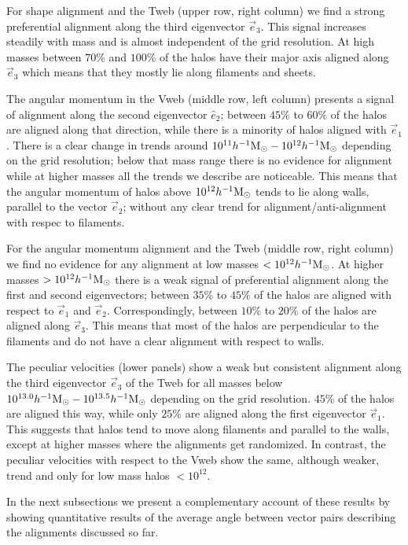 \documentclass[useAMS,usenatbib]{mn2e}
\newcommand{\hMsun}{{\ifmmode{h^{-1}{\rm
        {M_{\odot}}}}\else{$h^{-1}{\rm{M_{\odot}}}$~}\fi}}
\begin{document}
For shape alignment and the Tweb (upper row, right column) we find a strong
preferential alignment along the third eigenvector $\vec{e}_{3}$. This
signal increases steadily with mass and is almost independent of the
grid resolution. At high masses between $70\%$ and $100\%$ of the
halos have their major axis aligned along $\vec{e}_{3}$ which means
that they mostly lie along filaments and sheets.

The angular momentum in the Vweb (middle row, left column) presents 
a signal of alignment along the second eigenvector $\hat{e}_{2}$;
between $45\%$ to $60\%$ of the halos are aligned along that
direction, while there is a minority of halos aligned with
$\vec{e}_{1}$.  There is a clear change in trends around
$10^{11}\hMsun-10^{12}\hMsun$ depending on the grid resolution;
below that mass range there is no evidence for alignment while at
higher masses all the trends we describe are noticeable. This means
that the angular momentum of halos above $10^{12}\hMsun$ tends to lie
along walls, parallel to the vector $\vec{e}_2$; without any clear
trend for alignment/anti-alignment with respec to filaments.


For the angular momentum alignment and the Tweb (middle row, right
column) we find no evidence for any alignment at low masses $<10^{12}\hMsun$.
At higher masses $>10^{12}\hMsun$ there is a weak signal
of preferential alignment along the first and second eigenvectors;
between $35\%$ to $45\%$ of the halos are aligned with respect to
$\vec{e}_1$ and $\vec{e}_2$. Correspondingly, between $10\%$ to $20\%$
of the halos are aligned along $\vec{e}_{3}$. This means
that most of the halos are perpendicular to the filaments and do not
have a clear alignment with respect to walls.

The peculiar velocities (lower panels) show a weak but consistent
alignment along the third eigenvector $\vec{e}_{3}$ of the Tweb for
all masses below $10^{13.0}\hMsun-10^{13.5}\hMsun$ depending on the grid
resolution. $45\%$ of the halos are aligned this way, while only $25\%$ are
aligned along the first eigenvector $\vec{e}_1$. This suggests that
halos tend to move along filaments and parallel to the walls, except
at higher masses where the alignments get randomized.  In contrast,
the peculiar velocities with respect to the Vweb show the same,
although weaker, trend and only for low mass halos $<10^{12}$.


In the next subsections we present a complementary account of these
results by showing quantitative results of the average angle
between vector pairs describing the alignments discussed so far.
\end{document}
